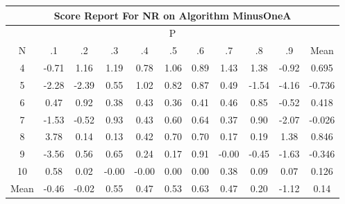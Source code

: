 \documentclass[11pt,a4paper]{report}
\begin{document}
\begin{longtable}{ | c || c | c | c | c | c | c | c | c | c || c |}
\hline
\multicolumn{11}{|c|}{ Score Report For NR on Algorithm MinusOneA} \\
\hline
\multicolumn{11}{|c|}{ P } \\
\hline
N & .1 & .2 & .3 & .4 & .5 & .6 & .7 & .8 & .9 & Mean\\
 \hline
 \hline
 \endhead
  4 &  \cellcolor[HTML]{FFEFEF} -0.71 &  \cellcolor[HTML]{DFDFFF} 1.16 &  \cellcolor[HTML]{DFDFFF} 1.19 &  \cellcolor[HTML]{EFEFFF} 0.78 &  \cellcolor[HTML]{E7E7FF} 1.06 &  \cellcolor[HTML]{E7E7FF} 0.89 &  \cellcolor[HTML]{DFDFFF} 1.43 &  \cellcolor[HTML]{DFDFFF} 1.38 &  \cellcolor[HTML]{FFE7E7} -0.92 & 0.695 \\
  5 &  \cellcolor[HTML]{FFC7C7} -2.28 &  \cellcolor[HTML]{FFBFBF} -2.39 &  \cellcolor[HTML]{EFEFFF} 0.55 &  \cellcolor[HTML]{E7E7FF} 1.02 &  \cellcolor[HTML]{E7E7FF} 0.82 &  \cellcolor[HTML]{E7E7FF} 0.87 &  \cellcolor[HTML]{EFEFFF} 0.49 &  \cellcolor[HTML]{FFD7D7} -1.54 &  \cellcolor[HTML]{FF9797} -4.16 & -0.736 \\
  6 &  \cellcolor[HTML]{F7F7FF} 0.47 &  \cellcolor[HTML]{E7E7FF} 0.92 &  \cellcolor[HTML]{F7F7FF} 0.38 &  \cellcolor[HTML]{F7F7FF} 0.43 &  \cellcolor[HTML]{F7F7FF} 0.36 &  \cellcolor[HTML]{F7F7FF} 0.41 &  \cellcolor[HTML]{F7F7FF} 0.46 &  \cellcolor[HTML]{E7E7FF} 0.85 &  \cellcolor[HTML]{FFEFEF} -0.52 & 0.418 \\
  7 &  \cellcolor[HTML]{FFD7D7} -1.53 &  \cellcolor[HTML]{FFEFEF} -0.52 &  \cellcolor[HTML]{E7E7FF} 0.93 &  \cellcolor[HTML]{F7F7FF} 0.43 &  \cellcolor[HTML]{EFEFFF} 0.60 &  \cellcolor[HTML]{EFEFFF} 0.64 &  \cellcolor[HTML]{F7F7FF} 0.37 &  \cellcolor[HTML]{E7E7FF} 0.90 &  \cellcolor[HTML]{FFC7C7} -2.07 & -0.026 \\
  8 &  \cellcolor[HTML]{9F9FFF} 3.78 &  \cellcolor[HTML]{FFFFFF} 0.14 &  \cellcolor[HTML]{FFFFFF} 0.13 &  \cellcolor[HTML]{F7F7FF} 0.42 &  \cellcolor[HTML]{EFEFFF} 0.70 &  \cellcolor[HTML]{EFEFFF} 0.70 &  \cellcolor[HTML]{F7F7FF} 0.17 &  \cellcolor[HTML]{F7F7FF} 0.19 &  \cellcolor[HTML]{DFDFFF} 1.38 & 0.846 \\
  9 &  \cellcolor[HTML]{FFA7A7} -3.56 &  \cellcolor[HTML]{EFEFFF} 0.56 &  \cellcolor[HTML]{EFEFFF} 0.65 &  \cellcolor[HTML]{F7F7FF} 0.24 &  \cellcolor[HTML]{F7F7FF} 0.17 &  \cellcolor[HTML]{E7E7FF} 0.91 &  \cellcolor[HTML]{FFFFFF} -0.00 &  \cellcolor[HTML]{FFF7F7} -0.45 &  \cellcolor[HTML]{FFD7D7} -1.63 & -0.346 \\
  10 &  \cellcolor[HTML]{EFEFFF} 0.58 &  \cellcolor[HTML]{FFFFFF} 0.02 &  \cellcolor[HTML]{FFFFFF} -0.00 &  \cellcolor[HTML]{FFFFFF} -0.00 &  \cellcolor[HTML]{FFFFFF} 0.00 &  \cellcolor[HTML]{FFFFFF} 0.00 &  \cellcolor[HTML]{F7F7FF} 0.38 &  \cellcolor[HTML]{FFFFFF} 0.09 &  \cellcolor[HTML]{FFFFFF} 0.07 & 0.126 \\
 \hline
 \hline
Mean &  \cellcolor[HTML]{FFF7F7} -0.46 &  \cellcolor[HTML]{FFFFFF} -0.02 &  \cellcolor[HTML]{EFEFFF} 0.55 &  \cellcolor[HTML]{F7F7FF} 0.47 &  \cellcolor[HTML]{EFEFFF} 0.53 &  \cellcolor[HTML]{EFEFFF} 0.63 &  \cellcolor[HTML]{F7F7FF} 0.47 &  \cellcolor[HTML]{F7F7FF} 0.20 &  \cellcolor[HTML]{FFDFDF} -1.12 &  \cellcolor[HTML]{FFFFFF} 0.14
\end{longtable}
\end{document}

